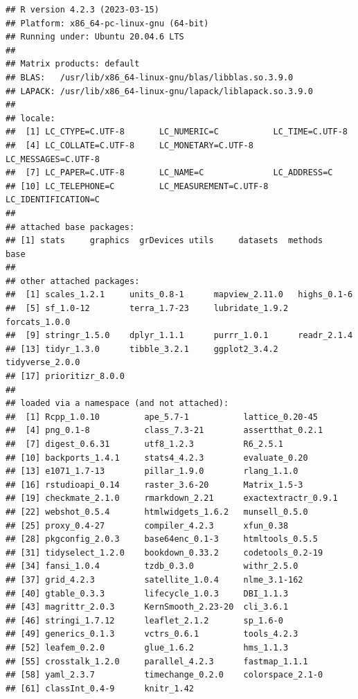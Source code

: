 \documentclass[
  12pt,
]{book}
\begin{document}
\begin{verbatim}
## R version 4.2.3 (2023-03-15)
## Platform: x86_64-pc-linux-gnu (64-bit)
## Running under: Ubuntu 20.04.6 LTS
## 
## Matrix products: default
## BLAS:   /usr/lib/x86_64-linux-gnu/blas/libblas.so.3.9.0
## LAPACK: /usr/lib/x86_64-linux-gnu/lapack/liblapack.so.3.9.0
## 
## locale:
##  [1] LC_CTYPE=C.UTF-8       LC_NUMERIC=C           LC_TIME=C.UTF-8       
##  [4] LC_COLLATE=C.UTF-8     LC_MONETARY=C.UTF-8    LC_MESSAGES=C.UTF-8   
##  [7] LC_PAPER=C.UTF-8       LC_NAME=C              LC_ADDRESS=C          
## [10] LC_TELEPHONE=C         LC_MEASUREMENT=C.UTF-8 LC_IDENTIFICATION=C   
## 
## attached base packages:
## [1] stats     graphics  grDevices utils     datasets  methods   base     
## 
## other attached packages:
##  [1] scales_1.2.1     units_0.8-1      mapview_2.11.0   highs_0.1-6     
##  [5] sf_1.0-12        terra_1.7-23     lubridate_1.9.2  forcats_1.0.0   
##  [9] stringr_1.5.0    dplyr_1.1.1      purrr_1.0.1      readr_2.1.4     
## [13] tidyr_1.3.0      tibble_3.2.1     ggplot2_3.4.2    tidyverse_2.0.0 
## [17] prioritizr_8.0.0
## 
## loaded via a namespace (and not attached):
##  [1] Rcpp_1.0.10         ape_5.7-1           lattice_0.20-45    
##  [4] png_0.1-8           class_7.3-21        assertthat_0.2.1   
##  [7] digest_0.6.31       utf8_1.2.3          R6_2.5.1           
## [10] backports_1.4.1     stats4_4.2.3        evaluate_0.20      
## [13] e1071_1.7-13        pillar_1.9.0        rlang_1.1.0        
## [16] rstudioapi_0.14     raster_3.6-20       Matrix_1.5-3       
## [19] checkmate_2.1.0     rmarkdown_2.21      exactextractr_0.9.1
## [22] webshot_0.5.4       htmlwidgets_1.6.2   munsell_0.5.0      
## [25] proxy_0.4-27        compiler_4.2.3      xfun_0.38          
## [28] pkgconfig_2.0.3     base64enc_0.1-3     htmltools_0.5.5    
## [31] tidyselect_1.2.0    bookdown_0.33.2     codetools_0.2-19   
## [34] fansi_1.0.4         tzdb_0.3.0          withr_2.5.0        
## [37] grid_4.2.3          satellite_1.0.4     nlme_3.1-162       
## [40] gtable_0.3.3        lifecycle_1.0.3     DBI_1.1.3          
## [43] magrittr_2.0.3      KernSmooth_2.23-20  cli_3.6.1          
## [46] stringi_1.7.12      leaflet_2.1.2       sp_1.6-0           
## [49] generics_0.1.3      vctrs_0.6.1         tools_4.2.3        
## [52] leafem_0.2.0        glue_1.6.2          hms_1.1.3          
## [55] crosstalk_1.2.0     parallel_4.2.3      fastmap_1.1.1      
## [58] yaml_2.3.7          timechange_0.2.0    colorspace_2.1-0   
## [61] classInt_0.4-9      knitr_1.42
\end{verbatim}

  
\end{document}
